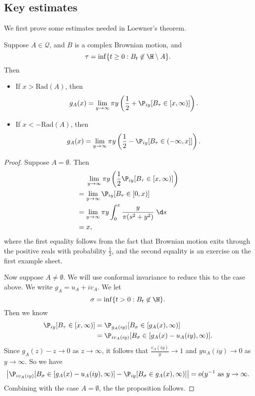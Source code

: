 \documentclass[a4paper]{article}
\newcommand\rad{\mathrm{Rad}}
\begin{document}
\subsection{Key estimates}
We first prove some estimates needed in Loewner's theorem.
\begin{prop}
  Suppose $A \in \mathcal{Q}$, and $B$ is a complex Brownian motion, and
  \[
    \tau = \inf \{t \geq 0: B_t \not \in \H \setminus A\}.
  \]
  Then
  \begin{itemize}
    \item If $x > \rad(A)$, then
      \[
        g_A(x) = \lim_{y \to \infty} \pi y \left(\frac{1}{2} + \P_{iy} [B_\tau \in [x, \infty)]\right).
      \]
    \item If $x < -\rad(A)$, then
      \[
        g_A(x) = \lim_{y \to \infty} \pi y \left(\frac{1}{2} - \P_{iy}[B_\tau \in (-\infty, x]]\right).
      \]
  \end{itemize}
\end{prop}

\begin{proof}
  Suppose $A = \emptyset$. Then
  \begin{align*}
    &\hphantom{{}={}}\lim_{y \to \infty} \pi y \left(\frac{1}{2} \P_{iy}[B_\tau \in [x, \infty)]\right)\\
    &= \lim_{y \to \infty} \P_{iy} [B_\tau \in [0, x)]\\
    &=\lim_{y \to \infty} \pi y \int_0^x \frac{y}{\pi (s^2 + y^2)}\;\d s\\
    &= x,
  \end{align*}
  where the first equality follows from the fact that Brownian motion exits through the positive reals with probability $\frac{1}{2}$, and the second equality is an exercise on the first example sheet.

  Now suppose $A \not= \emptyset$. We will use conformal invariance to reduce this to the case above. We write $g_A = u_A + i v_A$. We let
  \[
    \sigma = \inf \{t > 0: B_t \not \in \H\}.
  \]
  Then we know
  \begin{align*}
    \P_{iy} [B_\tau \in [x, \infty)] &= \P_{g_A(iy)} [B_\sigma \in [g_A(x), \infty)]\\
    &= \P_{iv_A(iy)} [B_\sigma \in [g_A(x) - u_A(iy), \infty)].
  \end{align*}
  Since $g_A(z) - z \to 0$ as $z \to \infty$, it follows that $\frac{v_A(iy)}{y} \to 1$ and $y u_A(iy) \to 0$ as $y \to \infty$. So we have
  \[
    \left|\P_{iv_A(iy)} [B_\sigma \in [g_A(x) - u_A(iy), \infty)] - \P_{iy}[B_\sigma \in g_A(x), \infty)]\right| = o(y^{-1}\text{ as }y \to \infty.
  \]
  Combining with the case $A = \emptyset$, the the proposition follows.
\end{proof}
\end{document}
